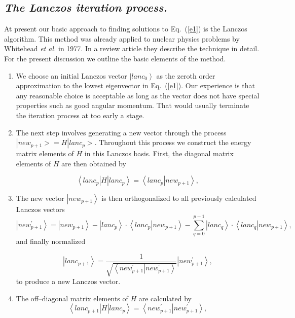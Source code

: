 \documentclass[twoside,12pt]{article}
\newcommand{\be}{\begin{equation}}
\newcommand{\ee}{\end{equation}}
\newcommand{\bra}[1]{\left\langle #1 \right|}
\newcommand{\ket}[1]{\left| #1 \right\rangle}
\begin{document}
\subsection{\it The Lanczos iteration process.}
%
At present our basic approach to finding solutions to Eq.~(\ref{e1})
is the Lanczos algorithm. This method was already applied to nuclear
physics problems by Whitehead {\sl et al.} in 1977.
In a review article \cite{whit77} they describe the technique in detail.
For the present discussion we outline the basic elements
of the method.
\begin{enumerate}
%
\item We choose  an initial Lanczos vector $\ket{lanc_0}$ as the zeroth order
approximation to the lowest eigenvector in Eq.~(\ref{e1}). Our experience
is that any  reasonable choice  is acceptable as long as the
vector does not have special properties such as good angular momentum.
That would usually terminate the iteration process at too early a
stage.
%
\item The next step involves generating a new  vector
through the process $|new_{p+1}> = H |lanc_p>$.
Throughout this process we construct the energy matrix elements
of $H$ in this Lanczos basis. First, the diagonal matrix elements of $H$
are then obtained by

%
\be
\bra{lanc_p} H \ket{lanc_p} = \bra{lanc_p} \left . new_{p+1} \right \rangle,
\label{lanc1}
\ee
%

\item The new vector $\ket{new_{p+1}}$ is then orthogonalized to all
previously calculated Lanczos vectors
%
\be
\ket{new_{p+1}^{'}} = \ket{new_{p+1}} - \ket{lanc_p} \cdot
	                \bra{lanc_p} \left . new_{p+1} \right \rangle		 - \sum_{q = 0}^{p-1} \ket{lanc_q} \cdot
	          \bra{lanc_q} \left . new_{p+1} \right \rangle,
\ee
%
and finally normalized

%
\be
\ket{lanc_{p+1}} = \frac{1}{\sqrt{\bra{new_{p+1}^{'}}
                      \left . new_{p+1}^{'} \right \rangle}}
						\ket{new_{p+1}^{'}},
\ee
%
to produce a new Lanczos vector.
%
\item The off--diagonal matrix elements of $H$ are calculated by
%
\be
\bra{lanc_{p+1}} H \ket{lanc_p} = \bra{new_{p+1}^{'}}
                                \left . new _{p+1}^{'}\right \rangle,
\label{off1}
\ee


\end{enumerate}
\end{document}
